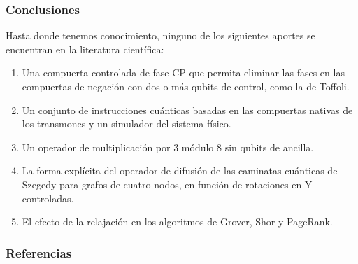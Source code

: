 \documentclass[xetex,mathserif,serif, 8pt]{beamer}
\begin{document}
\begin{frame}
    \frametitle{Conclusiones}

    Hasta donde tenemos conocimiento, ninguno de los siguientes aportes se encuentran en la literatura científica:

    \begin{enumerate}
        \item Una compuerta controlada de fase CP que permita eliminar las fases en las compuertas de negación con dos o más qubits de control, como la de Toffoli.
        \item Un conjunto de instrucciones cuánticas basadas en las compuertas nativas de los transmones y un simulador del sistema físico.
        \item Un operador de multiplicación por 3 módulo 8 sin qubits de ancilla.
        \item La forma explícita del operador de difusión de las caminatas cuánticas de Szegedy para grafos de cuatro nodos, en función de rotaciones en Y controladas.
        \item El efecto de la relajación en los algoritmos de Grover, Shor y PageRank.
    \end{enumerate}
\end{frame}

\begin{frame}[allowframebreaks]
        \frametitle{Referencias}
        
        
\end{frame}
\end{document}
